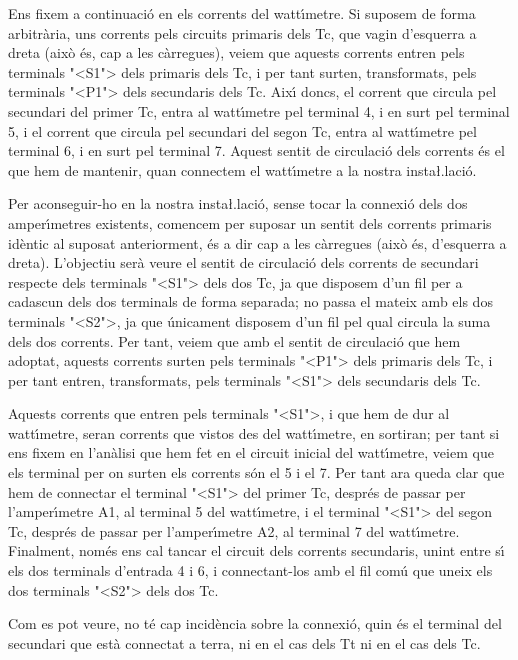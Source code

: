 \begin{exemple}
    Ens fixem a continuaci\'{o} en els corrents del watt\'{\i}metre. Si suposem
    de forma arbitr\`{a}ria, uns corrents pels circuits primaris dels Tc,
    que vagin d'esquerra a dreta (aix\`{o} \'{e}s, cap a les c\`{a}rregues), veiem
    que aquests corrents entren pels terminals {"<}\textsf{S1}{">} dels primaris dels Tc,
    i per tant surten, transformats, pels terminals {"<}\textsf{P1}{">} dels secundaris
    dels Tc. Aix\'{\i} doncs, el corrent que circula pel secundari del primer
    Tc, entra al watt\'{\i}metre pel terminal 4, i en surt pel terminal 5, i
    el corrent que circula pel secundari del segon Tc, entra al
    watt\'{\i}metre pel terminal 6, i en surt pel terminal 7. Aquest sentit
    de circulaci\'{o} dels corrents \'{e}s el que hem de mantenir, quan
    connectem el watt\'{\i}metre a la nostra insta{\l.l}aci\'{o}.

    Per aconseguir-ho en la nostra insta{\l.l}aci\'{o}, sense tocar la
    connexi\'{o} dels dos amper\'{\i}metres existents, comencem per suposar un
    sentit dels corrents primaris id\`{e}ntic al suposat anteriorment, \'{e}s a
    dir cap a les c\`{a}rregues (aix\`{o} \'{e}s, d'esquerra a dreta). L'objectiu
    ser\`{a} veure el sentit de circulaci\'{o} dels corrents de secundari
    respecte dels terminals {"<}\textsf{S1}{">} dels dos Tc, ja que disposem d'un fil per
    a cadascun dels dos terminals de forma separada; no passa el mateix
    amb els dos terminals {"<}\textsf{S2}{">}, ja que \'{u}nicament disposem d'un fil pel
    qual circula la suma dels dos corrents. Per tant, veiem que amb el
    sentit de circulaci\'{o} que hem adoptat, aquests corrents surten pels
    terminals {"<}\textsf{P1}{">} dels primaris dels Tc, i per tant entren, transformats,
    pels terminals {"<}\textsf{S1}{">} dels secundaris dels Tc.

    Aquests corrents que entren pels terminals {"<}\textsf{S1}{">}, i que hem de dur al
    watt\'{\i}metre, seran corrents que vistos des del watt\'{\i}metre, en
    sortiran; per tant si ens fixem en l'an\`{a}lisi que hem fet en el
    circuit inicial del watt\'{\i}metre, veiem que els terminal per on surten
    els corrents s\'{o}n el 5 i el 7. Per tant ara queda clar que hem de
    connectar el terminal {"<}\textsf{S1}{">} del primer Tc, despr\'{e}s de passar per
    l'amper\'{\i}metre \textsf{A1}, al terminal 5 del watt\'{\i}metre, i el
    terminal {"<}\textsf{S1}{">} del segon Tc, despr\'{e}s de passar per l'amper\'{\i}metre
    \textsf{A2}, al terminal 7 del watt\'{\i}metre. Finalment, nom\'{e}s ens cal
    tancar el circuit dels corrents secundaris, unint entre s\'{\i} els dos
    terminals d'entrada 4  i 6, i connectant-los amb el fil com\'{u} que
    uneix els dos terminals {"<}\textsf{S2}{">} dels dos Tc.

    Com es pot veure, no t\'{e} cap incid\`{e}ncia sobre la connexi\'{o}, quin \'{e}s
    el terminal del secundari que est\`{a} connectat a terra, ni en el cas
    dels Tt ni en el cas dels Tc.
\end{exemple}
